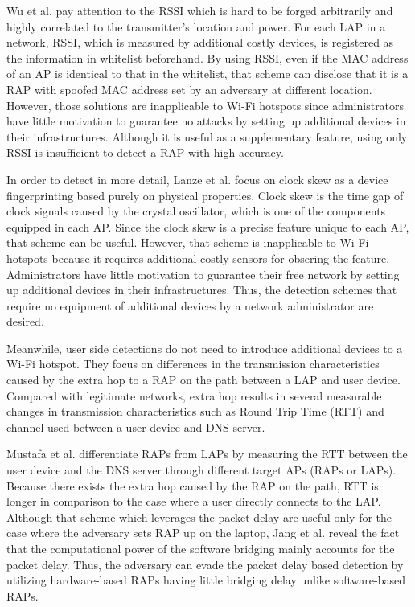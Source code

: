 \documentclass[conference]{IEEEtran}
\begin{document}
Wu et al. \cite{prapd} pay attention to the RSSI which is hard to be forged arbitrarily and highly correlated to the transmitter's location and power.
For each LAP in a network, RSSI, which is measured by additional costly devices, is registered as the information in whitelist beforehand.
By using RSSI, even if the MAC address of an AP is identical to that in the whitelist, that scheme can disclose that it is a RAP with spoofed MAC address set by an adversary at different location.
However, those solutions are inapplicable to Wi-Fi hotspots since administrators have little motivation to guarantee no attacks by setting up additional devices in their infrastructures.
Although it is useful as a supplementary feature, using only RSSI is insufficient to detect a RAP with high accuracy.

In order to detect in more detail, Lanze et al. \cite{clockskew} focus on clock skew as a device fingerprinting based purely on physical properties.
Clock skew is the time gap of clock signals caused by the crystal oscillator, which is one of the components equipped in each AP.
Since the clock skew is a precise feature unique to each AP, that scheme can be useful.
However, that scheme is inapplicable to Wi-Fi hotspots because it requires additional costly sensors for obsering the feature.
Administrators have little motivation to guarantee their free network by setting up additional devices in their infrastructures.
Thus, the detection schemes that require no equipment of additional devices by a network administrator are desired.

Meanwhile, user side detections do not need to introduce additional devices to a Wi-Fi hotspot.
They focus on differences in the transmission characteristics caused by the extra hop to a RAP on the path between a LAP and user device. 
Compared with legitimate networks, extra hop results in several measurable changes in transmission characteristics such as Round Trip Time (RTT) and channel used between a user device and DNS server.

Mustafa et al. \cite{rtt} differentiate RAPs from LAPs by measuring the RTT between the user device and the DNS server through different target APs (RAPs or LAPs).
Because there exists the extra hop caused by the RAP on the path, RTT is longer in comparison to the case where a user directly connects to the LAP.
Although that scheme which leverages the packet delay are useful only for the case where the adversary sets RAP up on the laptop, Jang et al. \cite{previous} reveal the fact that the computational power of the software bridging mainly accounts for the packet delay.
Thus, the adversary can evade the packet delay based detection by utilizing hardware-based RAPs having little bridging delay unlike software-based RAPs.
\end{document}
